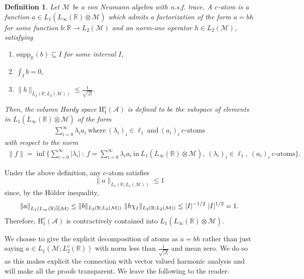 \documentclass[psamsfonts]{amsart}
\newtheorem{definition}[theorem]{Definition}
\newcommand{\R}{\mathbb{R}}
\newcommand*{\bigchi}{\mbox{\large$\chi$}}
\newcommand{\Lone}{L_1}
\newcommand{\Linfty}{L_\infty}
\newcommand{\Ltwo}{L_2}
\newcommand{\Ltwoc}{L_2^c}
\newcommand{\Honec}{\mathrm{H}_1^c}
\newcommand{\Hardyc}{\Honec(\mathcal{A})}
\newcommand{\Avnat}{\Linfty(\mathbb{R}) \overline{\otimes} \mathcal{M}}
\begin{document}
    \begin{definition}\label{def:catom}
        Let $\mathcal{M}$ be a von Neumann algebra with n.s.f. trace. A \emph{$c$-atom} is a function $a \in \Lone(\Avnat)$ which admits a factorization of the form $a = b h$ for some function $b : \R \rightarrow \Ltwo(\mathcal{M})$ and an norm-one operator $h \in \Ltwo(\mathcal{M})$, satisfying
        \begin{enumerate}
            \item $\mathrm{supp}_{\mathbb{R}}(b) \subseteq I$ for some interval $I$,
            \item $\int_{I} b = 0$,
            \item $\|b\|_{\Ltwo(\R;\Ltwo(\mathcal{M}))} \leq \frac{1}{\sqrt{|I|}}$.
        \end{enumerate}
        Then, the \emph{column Hardy space} $\Hardyc$ is defined to be the subspace of elements in $\Lone(\Avnat)$ of the form
        \begin{align}
            \sum\limits_{i=0}^{\infty} \lambda_i a_i \ \mathrm{where \ } (\lambda_i)_i \in \ell_1 \ \mathrm{and} \ (a_i)_i \ c\mbox{-}\mathrm{atoms}
        \end{align}
        with respect to the norm
        \begin{align*}
            \|f\| = \inf \{ \sum_{i=0}^{\infty} |\lambda_i| \ : \ f = \sum_{i = 0}^{\infty} \lambda_i a_i \ \mathrm{in \ } \Lone(\Avnat), \ (\lambda_i)_i \in \ell_1, \ (a_i)_i \ c\mbox{-}\mathrm{atoms} \}.
         \end{align*}
    \end{definition}

    Under the above definition, any $c$-atom satisfies
    $$
    \|a\|_{\Lone(\R;\Lone(\mathcal{M}))} \leq 1
    $$
    since, by the Hölder inequality,
    \begin{align*}
        \|a\|_{\Lone(\Avnat)} \leq \|b\|_{\Ltwo(\R;\Ltwo(\mathcal{M}))} \ \|h  \bigchi_{I}\|_{\Ltwo(\R;\Ltwo(\mathcal{M}))} \leq |I|^{-1/2} \ |I|^{1/2} = 1.
    \end{align*}
    Therefore, $\Hardyc$ is contractively contained into $\Lone(\Avnat)$.
    
  We choose to give the explicit decomposition of atoms as $a=bh$ rather than just saying $a\in L_1(\mathcal M;\Ltwoc(\R))$ with norm less than $\frac 1 {\sqrt {|I|}}$ and mean zero. We do so as this makes explicit the connection with vector valued harmonic analysis and will make all the proofs transparent. We leave the following to the reader:
\end{document}
